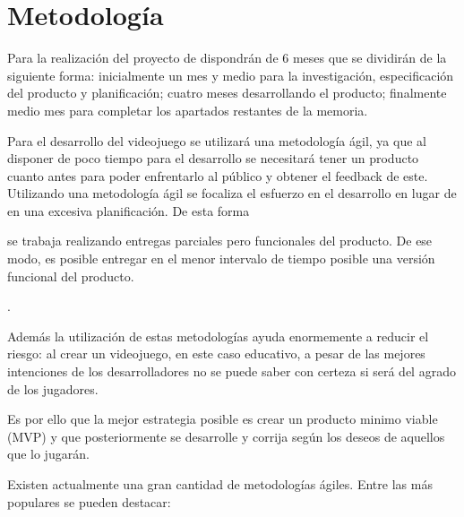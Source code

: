 \chapter{Metodología}

Para la realización del proyecto de dispondrán de 6 meses que se dividirán de la siguiente forma: inicialmente un mes y medio para la investigación, especificación del producto y planificación; cuatro meses desarrollando el producto; finalmente medio mes para completar los apartados  restantes de la memoria.


Para el desarrollo del videojuego se utilizará una metodología ágil, ya que al disponer de poco tiempo para el desarrollo se necesitará tener un producto cuanto antes para poder enfrentarlo al público y obtener el feedback de este. Utilizando una metodología ágil se focaliza el esfuerzo en el desarrollo en lugar de en una excesiva planificación. De esta forma 
\begin{itquote}
	se trabaja realizando entregas parciales pero funcionales del producto. De ese modo, es posible entregar en el menor intervalo de tiempo posible una versión funcional del producto.
	\begin{flushright}
	 	\cite{eduardomartinez2014}.
 	\end{flushright}
\end{itquote}

Además la utilización de estas metodologías ayuda enormemente a reducir el riesgo: al crear un videojuego, en este caso educativo, a pesar de las mejores intenciones de los desarrolladores no se puede saber con certeza si será del agrado de los jugadores.

Es por ello que la mejor estrategia posible es crear un producto minimo viable (MVP) y que posteriormente se desarrolle y corrija según los deseos de aquellos que lo jugarán. 

Existen actualmente una gran cantidad de metodologías ágiles. Entre las más populares se pueden destacar: 

